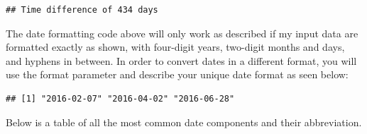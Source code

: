 \documentclass[]{book}
\newenvironment{Shaded}{\begin{snugshade}}{\end{snugshade}}
\newcommand{\KeywordTok}[1]{\textcolor[rgb]{0.13,0.29,0.53}{\textbf{{#1}}}}
\newcommand{\DataTypeTok}[1]{\textcolor[rgb]{0.13,0.29,0.53}{{#1}}}
\newcommand{\StringTok}[1]{\textcolor[rgb]{0.31,0.60,0.02}{{#1}}}
\newcommand{\CommentTok}[1]{\textcolor[rgb]{0.56,0.35,0.01}{\textit{{#1}}}}
\newcommand{\NormalTok}[1]{{#1}}
\begin{document}
\begin{verbatim}
## Time difference of 434 days
\end{verbatim}

The date formatting code above will only work as described if my input
data are formatted exactly as shown, with four-digit years, two-digit
months and days, and hyphens in between. In order to convert dates in a
different format, you will use the format parameter and describe your
unique date format as seen below:

\begin{Shaded}
\end{Shaded}

\begin{verbatim}
## [1] "2016-02-07" "2016-04-02" "2016-06-28"
\end{verbatim}

Below is a table of all the most common date components and their
abbreviation.
\end{document}
